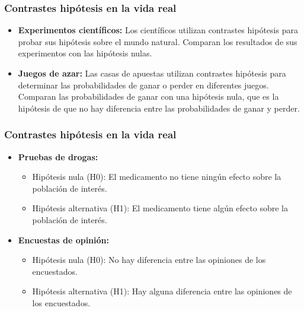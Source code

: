 \documentclass[aspectratio=169]{beamer}
\begin{document}
\begin{frame}

\frametitle{Contrastes hipótesis en la vida real}

\begin{itemize}

\item {\bf Experimentos científicos:} Los científicos utilizan contrastes hipótesis para probar sus hipótesis sobre el mundo natural. Comparan los resultados de sus experimentos con las hipótesis nulas.

\item {\bf Juegos de azar:} Las casas de apuestas utilizan contrastes hipótesis para determinar las probabilidades de ganar o perder en diferentes juegos. Comparan las probabilidades de ganar con una hipótesis nula, que es la hipótesis de que no hay diferencia entre las probabilidades de ganar y perder.

\end{itemize}

\end{frame}



\begin{frame}

\frametitle{Contrastes hipótesis en la vida real}

\begin{itemize}

\item {\bf Pruebas de drogas:}

\begin{itemize}
\item Hipótesis nula (H0): El medicamento no tiene ningún efecto sobre la población de interés.
\item Hipótesis alternativa (H1): El medicamento tiene algún efecto sobre la población de interés.
\end{itemize}

\item {\bf Encuestas de opinión:}

\begin{itemize}
\item Hipótesis nula (H0): No hay diferencia entre las opiniones de los encuestados.
\item Hipótesis alternativa (H1): Hay alguna diferencia entre las opiniones de los encuestados.
\end{itemize}
\end{itemize}

\end{frame}
\end{document}
